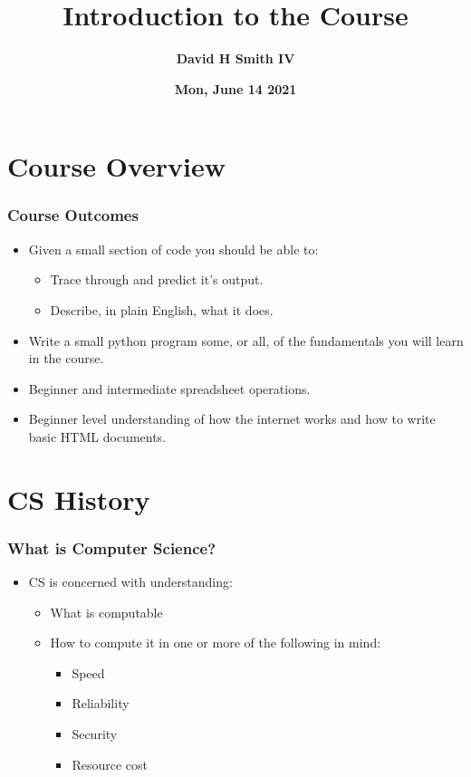 \documentclass{beamer}
\title{\textbf{Introduction to the Course}}
\author{\textbf{David H Smith IV}}
\institute[\textbf{UIUC}]{\textbf{University of Illinois Urbana-Champaign}}
\date{\textbf{Mon, June 14 2021}}
\begin{document}
\frame{\titlepage}

\section{Course Overview}

%
%
\begin{frame}
  \frametitle{Course Outcomes}
  \begin{itemize}
    \item Given a small section of code you should be able to:
      \begin{itemize}
        \item Trace through and predict it's output.
        \item Describe, in plain English, what it does.
      \end{itemize}
    \item Write a small python program some, or all, of the fundamentals you will learn in the course.
    \item Beginner and intermediate spreadsheet operations.
    \item Beginner level understanding of how the internet works and how to write basic HTML documents.
  \end{itemize}
\end{frame}

\section{CS History}

%
%
\begin{frame}
  \frametitle{What is Computer Science?}
  \begin{itemize}
    \item CS is concerned with understanding:
      \begin{itemize}
      \item What is computable
      \item How to compute it in one or more of the following in mind:
        \begin{itemize}
        \item Speed
        \item Reliability
        \item Security 
        \item Resource cost
      \end{itemize}
  \end{itemize}
  \end{itemize}
\end{frame}
\end{document}
